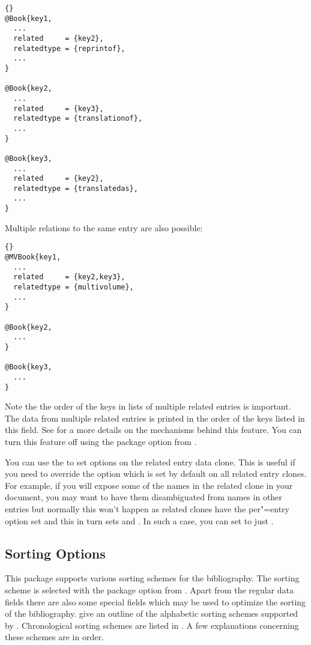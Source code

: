 \documentclass{ltxdockit}[2011/03/25]
\begin{document}
\begin{lstlisting}[style=bibtex]{}
@Book{key1,
  ...
  related     = {key2},
  relatedtype = {reprintof},
  ...
}

@Book{key2,
  ...
  related     = {key3},
  relatedtype = {translationof},
  ...
}

@Book{key3,
  ...
  related     = {key2},
  relatedtype = {translatedas},
  ...
}
\end{lstlisting}
%
Multiple relations to the same entry are also possible:
\begin{lstlisting}[style=bibtex]{}
@MVBook{key1,
  ...
  related     = {key2,key3},
  relatedtype = {multivolume},
  ...
}

@Book{key2,
  ...
}

@Book{key3,
  ...
}
\end{lstlisting}
%
Note the the order of the keys in lists of multiple related entries is important. The data from multiple related entries is printed in the order of the keys listed in this field. See  for a more details on the mechanisms behind this feature. You can turn this feature off using the package option  from .

You can use the  to set options on the related entry data clone. This is useful if you need to override the  option which is set by default on all related entry clones. For example, if you will expose some of the names in the related clone in your document, you may want to have them disambiguated from names in other entries but normally this won't happen as related clones have the per"=entry  option set and this in turn sets  and . In such a case, you can set  to just .

\subsection{Sorting Options}
\label{use:srt}

This package supports various sorting schemes for the bibliography. The sorting scheme is selected with the  package option from . Apart from the regular data fields there are also some special fields which may be used to optimize the sorting of the bibliography.  give an outline of the alphabetic sorting schemes supported by . Chronological sorting schemes are listed in . A few explanations concerning these schemes are in order.
\end{document}
